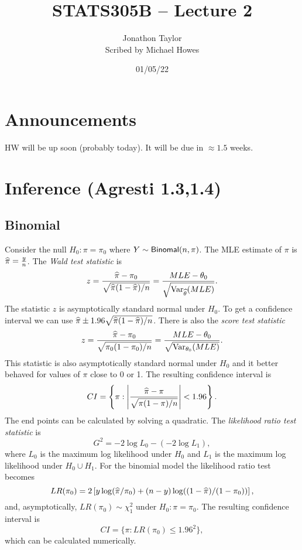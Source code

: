 




\title{STATS305B -- Lecture 2}
\author{Jonathon Taylor\\ Scribed by Michael Howes}
\date{01/05/22}

\pagestyle{fancy}
\fancyhf{}


\maketitle
\tableofcontents
\section{Announcements}
HW will be up soon (probably today). It will be due in $\approx 1.5$ weeks.
\section{Inference (Agresti 1.3,1.4)}
\subsection{Binomial}
Consider the null $H_0 : \pi = \pi_0$ where $Y \sim \mathsf{Binomal}(n,\pi)$. The MLE estimate of $\pi$ is $\widehat{\pi}= \frac{y}{n}$. The \emph{Wald test statistic} is
\[z = \frac{\widehat{\pi}-\pi_0}{\sqrt{\widehat{\pi}(1-\widehat{\pi})/n}} = \frac{MLE-{\theta}_0}{\sqrt{\operatorname{Var}_{\widehat{{\theta}}}(MLE)}}.\]
The statistic $z$ is asymptotically standard normal under $H_0$. To get a confidence interval we can use $\widehat{\pi} \pm 1.96\sqrt{\widehat{\pi}(1-\widehat{\pi})/n}$. There is also the \emph{score test statistic}
\[z = \frac{\widehat{\pi}-\pi_0}{\sqrt{\pi_0(1-\pi_0)/n}} = \frac{MLE-{\theta}_0}{\sqrt{\operatorname{Var}_{{\theta}_0}(MLE)}}. \]
This statistic is also asymptotically standard normal under $H_0$ and it better behaved for values of $\pi$ close to 0 or 1. The resulting confidence interval is
\[CI = \left\{\pi : {\left\lvert\frac{\widehat{\pi}-\pi}{\sqrt{\pi(1-\pi)/n}}\right\rvert} < 1.96\right\}.\]
The end points can be calculated by solving a quadratic. The \emph{likelihood ratio test statistic} is
\[G^2 = -2\log L_0 - (-2 \log L_1), \]
where $L_0$ is the maximum log likelihood under $H_0$ and $L_1$ is the maximum log likelihood under $H_0 \cup H_1$. For the binomial model the likelihood ratio test becomes 
\[LR(\pi_0) = 2\left[y\log(\widehat{\pi}/\pi_0)+(n-y)\log((1-\widehat{\pi})/(1-\pi_0))\right], \]
and, asymptotically, $LR(\pi_0) \sim \chi_1^2$ under $H_0 : \pi = \pi_0$. The resulting confidence interval is \[CI=  \{\pi : LR(\pi_0) \le 1.96^2\},\] which can be calculated numerically.
